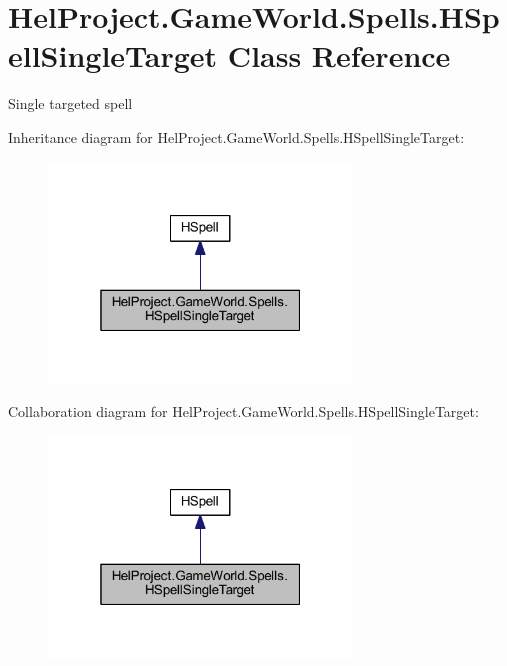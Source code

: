 \hypertarget{class_hel_project_1_1_game_world_1_1_spells_1_1_h_spell_single_target}{}\section{Hel\+Project.\+Game\+World.\+Spells.\+H\+Spell\+Single\+Target Class Reference}
\label{class_hel_project_1_1_game_world_1_1_spells_1_1_h_spell_single_target}


Single targeted spell  




Inheritance diagram for Hel\+Project.\+Game\+World.\+Spells.\+H\+Spell\+Single\+Target\+:\nopagebreak
\begin{figure}[H]
\begin{center}
\leavevmode
\includegraphics[width=229pt]{class_hel_project_1_1_game_world_1_1_spells_1_1_h_spell_single_target__inherit__graph}
\end{center}
\end{figure}


Collaboration diagram for Hel\+Project.\+Game\+World.\+Spells.\+H\+Spell\+Single\+Target\+:\nopagebreak
\begin{figure}[H]
\begin{center}
\leavevmode
\includegraphics[width=229pt]{class_hel_project_1_1_game_world_1_1_spells_1_1_h_spell_single_target__coll__graph}
\end{center}
\end{figure}
